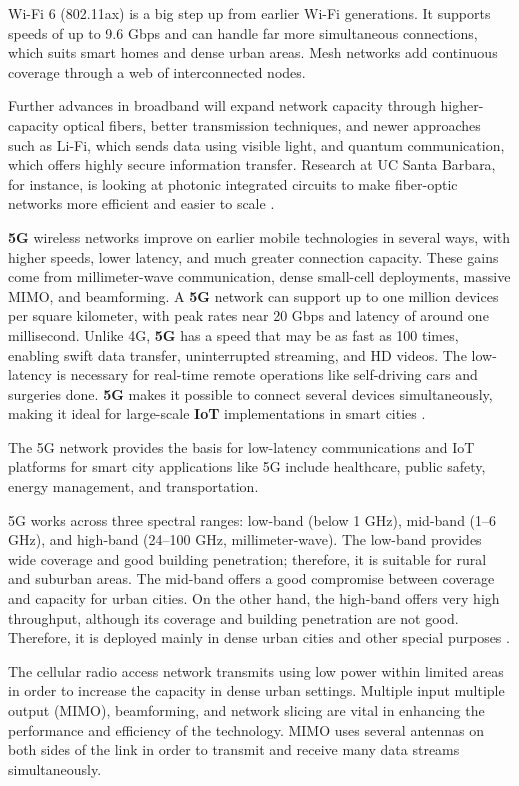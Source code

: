 \documentclass[pdflatex,sn-mathphys-num]{sn-jnl}%
\theoremstyle{thmstyleone}%
\theoremstyle{thmstyletwo}%
\theoremstyle{thmstylethree}%
\begin{document}
Wi-Fi 6 (802.11ax) is a big step up from earlier Wi-Fi generations. It supports speeds of up to 9.6 Gbps and can handle far more simultaneous connections, which suits smart homes and dense urban areas. Mesh networks add continuous coverage through a web of interconnected nodes.

Further advances in broadband will expand network capacity through higher-capacity optical fibers, better transmission techniques, and newer approaches such as Li-Fi, which sends data using visible light, and quantum communication, which offers highly secure information transfer. Research at UC Santa Barbara, for instance, is looking at photonic integrated circuits to make fiber-optic networks more efficient and easier to scale \cite{r33}.

\textbf{5G} wireless networks improve on earlier mobile technologies in several ways, with higher speeds, lower latency, and much greater connection capacity. These gains come from millimeter-wave communication, dense small-cell deployments, massive MIMO, and beamforming. A \textbf{5G} network can support up to one million devices per square kilometer, with peak rates near 20 Gbps and latency of around one millisecond. Unlike 4G, \textbf{5G} has a speed that may be as fast as 100 times, enabling swift data transfer, uninterrupted streaming, and HD videos. The low-latency is necessary for real-time remote operations like self-driving cars and surgeries done. \textbf{5G} makes it possible to connect several devices simultaneously, making it ideal for large-scale \textbf{IoT} implementations in smart cities \cite{r36}.

The 5G network provides the basis for low-latency communications and IoT platforms for smart city applications \cite{r36} like 5G include healthcare, public safety, energy management, and transportation.

5G works across three spectral ranges: low-band (below 1 GHz), mid-band (1--6 GHz), and high-band (24--100 GHz, millimeter-wave). The low-band provides wide coverage and good building penetration; therefore, it is suitable for rural and suburban areas. The mid-band offers a good compromise between coverage and capacity for urban cities. On the other hand, the high-band offers very high throughput, although its coverage and building penetration are not good. Therefore, it is deployed mainly in dense urban cities and other special purposes \cite{r37}.

The cellular radio access network transmits using low power within limited areas in order to increase the capacity in dense urban settings. Multiple input multiple output (MIMO), beamforming, and network slicing are vital in enhancing the performance and efficiency of the technology. MIMO uses several antennas on both sides of the link in order to transmit and receive many data streams simultaneously.
\end{document}

